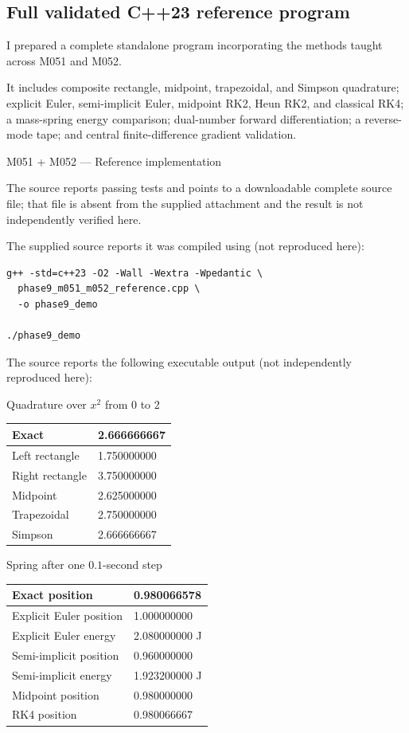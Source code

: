 \subsection{Full validated C++23 reference program}\label{02-foundations-ii-ch022-full-validated-c23-reference-program}

I prepared a complete standalone program incorporating the methods taught across M051 and M052.

It includes composite rectangle, midpoint, trapezoidal, and Simpson quadrature; explicit Euler, semi-implicit Euler, midpoint RK2, Heun RK2, and classical RK4; a mass-spring energy comparison; dual-number forward differentiation; a reverse-mode tape; and central finite-difference gradient validation.

M051 + M052 --- Reference implementation

The source reports passing tests and points to a downloadable complete source file; that file is absent from the supplied attachment and the result is not independently verified here.

The supplied source reports it was compiled using (not reproduced here):

\begin{verbatim}
g++ -std=c++23 -O2 -Wall -Wextra -Wpedantic \
  phase9_m051_m052_reference.cpp \
  -o phase9_demo

./phase9_demo
\end{verbatim}

The source reports the following executable output (not independently reproduced here):

Quadrature over \(x^2\) from 0 to 2

{\def\LTcaptype{none} %
\begin{longtable}[]{@{}ll@{}}
\toprule\noalign{}
Exact & 2.666666667 \\
\midrule\noalign{}
\endhead
\bottomrule\noalign{}
\endlastfoot
Left rectangle & 1.750000000 \\
Right rectangle & 3.750000000 \\
Midpoint & 2.625000000 \\
Trapezoidal & 2.750000000 \\
Simpson & 2.666666667 \\
\end{longtable}
}

Spring after one \(0.1\)-second step

{\def\LTcaptype{none} %
\begin{longtable}[]{@{}ll@{}}
\toprule\noalign{}
Exact position & 0.980066578 \\
\midrule\noalign{}
\endhead
\bottomrule\noalign{}
\endlastfoot
Explicit Euler position & 1.000000000 \\
Explicit Euler energy & 2.080000000 J \\
Semi-implicit position & 0.960000000 \\
Semi-implicit energy & 1.923200000 J \\
Midpoint position & 0.980000000 \\
RK4 position & 0.980066667 \\
\end{longtable}
}

